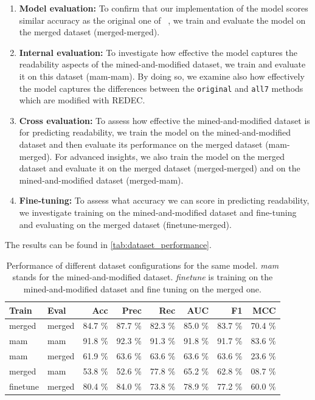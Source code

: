 \documentclass[%
class=scrreprt,
chapterprefix=false,%
open=right,%
twoside=false,%
paper=a4,%
logofile={Logo\_zentral\_farbig\_EN.png},%
thesistype=master,%
UKenglish,%
]{se2thesis}
\theoremstyle{definition}
\newcommand{\rdh}{REDEC\xspace}
\begin{document}
	\begin{enumerate}
		\item \textbf{Model evaluation:}
		To confirm that our implementation of the model scores similar accuracy as the original one of \citeauthor{mi2022towards}~\cite{mi2022towards}, we train and evaluate the model on the merged dataset (merged-merged).
		
		\item \textbf{Internal evaluation:} 
		To investigate how effective the model captures the readability aspects of the mined-and-modified dataset, we train and evaluate it on this dataset (mam-mam). By doing so, we examine also how effectively the model captures the differences between the \texttt{original} and \texttt{all7} methods which are modified with \rdh.
		
		\item \textbf{Cross evaluation:} 
		To assess how effective the mined-and-modified dataset is for predicting readability, we train the model on the mined-and-modified dataset and then evaluate its performance on the merged dataset (mam-merged). For advanced insights, we also train the model on the merged dataset and evaluate it on the merged dataset (merged-merged) and on the mined-and-modified dataset (merged-mam).
		
		\item \textbf{Fine-tuning:} 
		To assess what accuracy we can score in predicting readability, we investigate training on the mined-and-modified dataset and fine-tuning and evaluating on the merged dataset (finetune-merged).		
		
	\end{enumerate}
	
	The results can be found in \autoref{tab:dataset_performance}.
		
	\begin{table}[tb]
		\centering
		\caption{Performance of different dataset configurations for the same model. \textit{mam} stands for the mined-and-modified dataset. \textit{finetune} is training on the mined-and-modified dataset and fine tuning on the merged one.
		}
		\label{tab:dataset_performance}
		\begin{tabular}{llrrrrrr}
			\toprule
			Train & Eval & Acc & Prec & Rec & AUC & F1 & MCC \\
			\midrule
			merged      & merged   	& 84.7 \% & 87.7 \% & 82.3 \% & 85.0 \% & 83.7 \% & 70.4 \% \\
			mam        	& mam    	& 91.8 \% & 92.3 \% & 91.3 \% & 91.8 \% & 91.7 \% & 83.6 \% \\
			mam			& merged    & 61.9 \% & 63.6 \% & 63.6 \% & 63.6 \% & 63.6 \% & 23.6 \% \\
			merged      & mam	    & 53.8 \% & 52.6 \% & 77.8 \% & 65.2 \% & 62.8 \% & 08.7 \% \\
			finetune	& merged    & 80.4 \% & 84.0 \% & 73.8 \% & 78.9 \% & 77.2 \% & 60.0 \% \\
			\bottomrule
		\end{tabular}
	\end{table}
	
\end{document}
